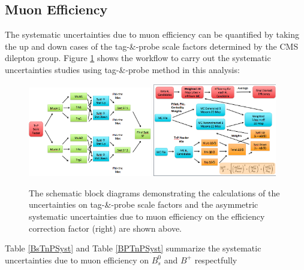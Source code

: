 \subsection{Muon Efficiency}

The systematic uncertainties due to muon efficiency can be quantified by taking the up and down cases of the tag-\&-probe scale factors determined by the CMS dilepton group. Figure \ref{MuonEffSystWF} shows the workflow to carry out the systematic uncertainties studies using tag-\&-probe method in this analysis:

\begin{figure}[h]
\begin{center}
\includegraphics[width=0.48\textwidth]{Figures/Chapter4/TnPSystScheme.png}
\includegraphics[width=0.48\textwidth]{Figures/Chapter4/TnPSystCal.png}
\caption{The schematic block diagrams demonstrating the calculations of the uncertainties on tag-\&-probe scale factors and the asymmetric systematic uncertainties due to muon efficiency on the efficiency correction factor (right) are shown above.} 
\label{MuonEffSystWF} 
\end{center}
\end{figure}

Table \ref{BsTnPSyst} and Table \ref{BPTnPSyst} summarize the systematic uncertainties due to muon efficiency on $B^0_s$ and $B^+$ respectfully

